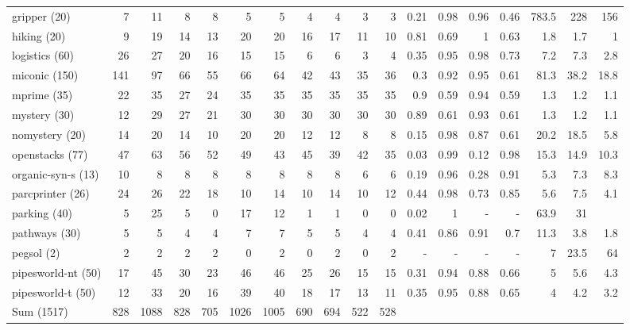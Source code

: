 \begin{tabular}{l||r|rrr||rr|rr|rr||rr|rr||rrr}
gripper (20)           & 7 & 11 & 8 & 8 & 5 & 5 & 4 & 4 & 3 & 3 & 0.21 & 0.98 & 0.96 & 0.46 & 783.5 & 228 & 156 \\
hiking (20)            & 9 & 19 & 14 & 13 & 20 & 20 & 16 & 17 & 11 & 10 & 0.81 & 0.69 & 1 & 0.63 & 1.8 & 1.7 & 1 \\
logistics (60)         & 26 & 27 & 20 & 16 & 15 & 15 & 6 & 6 & 3 & 4 & 0.35 & 0.95 & 0.98 & 0.73 & 7.2 & 7.3 & 2.8 \\
miconic (150)          & 141 & 97 & 66 & 55 & 66 & 64 & 42 & 43 & 35 & 36 & 0.3 & 0.92 & 0.95 & 0.61 & 81.3 & 38.2 & 18.8 \\
mprime (35)            & 22 & 35 & 27 & 24 & 35 & 35 & 35 & 35 & 35 & 35 & 0.9 & 0.59 & 0.94 & 0.59 & 1.3 & 1.2 & 1.1 \\
mystery (30)           & 12 & 29 & 27 & 21 & 30 & 30 & 30 & 30 & 30 & 30 & 0.89 & 0.61 & 0.93 & 0.61 & 1.3 & 1.2 & 1.1 \\
nomystery (20)         & 14 & 20 & 14 & 10 & 20 & 20 & 12 & 12 & 8 & 8 & 0.15 & 0.98 & 0.87 & 0.61 & 20.2 & 18.5 & 5.8 \\
openstacks (77)        & 47 & 63 & 56 & 52 & 49 & 43 & 45 & 39 & 42 & 35 & 0.03 & 0.99 & 0.12 & 0.98 & 15.3 & 14.9 & 10.3 \\
organic-syn-s (13)     & 10 & 8 & 8 & 8 & 8 & 8 & 8 & 8 & 6 & 6 & 0.19 & 0.96 & 0.28 & 0.91 & 5.3 & 7.3 & 8.3 \\
parcprinter (26)       & 24 & 26 & 22 & 18 & 10 & 14 & 10 & 14 & 10 & 12 & 0.44 & 0.98 & 0.73 & 0.85 & 5.6 & 7.5 & 4.1 \\
parking (40)           & 5 & 25 & 5 & 0 & 17 & 12 & 1 & 1 & 0 & 0 & 0.02 & 1 &   -       &   -       & 63.9 & 31 &      \\
pathways (30)          & 5 & 5 & 4 & 4 & 7 & 7 & 5 & 5 & 4 & 4 & 0.41 & 0.86 & 0.91 & 0.7 & 11.3 & 3.8 & 1.8 \\
pegsol (2)             & 2 & 2 & 2 & 2 & 0 & 2 & 0 & 2 & 0 & 2 &    -      &    -      &    -      &    -      & 7 & 23.5 & 64 \\
pipesworld-nt (50)     & 17 & 45 & 30 & 23 & 46 & 46 & 25 & 26 & 15 & 15 & 0.31 & 0.94 & 0.88 & 0.66 & 5 & 5.6 & 4.3 \\
pipesworld-t (50)      & 12 & 33 & 20 & 16 & 39 & 40 & 18 & 17 & 13 & 11 & 0.35 & 0.95 & 0.88 & 0.65 & 4 & 4.2 & 3.2 \\\hline
Sum (1517)             & 828 & 1088 & 828 & 705 & 1026 & 1005 & 690 & 694 & 522 & 528 &      &      &      &      &      &      &      \\
\end{tabular}
